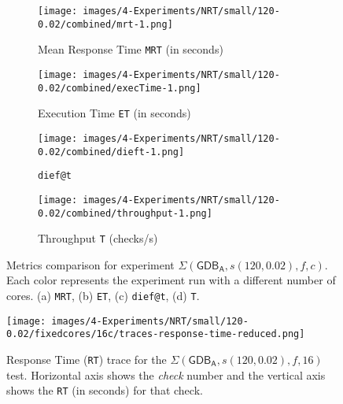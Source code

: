 \begin{figure}[H]
    \centering
    \hspace*{-3cm} %
    \begin{subfigure}{0.5\textwidth}
        \centering
        \texttt{[image: images/4-Experiments/NRT/small/120-0.02/combined/mrt-1.png]}
        \caption{Mean Response Time \texttt{MRT} (in seconds)}
        \label{fig:exps-small-120-mrt}
    \end{subfigure}
    \hspace{0.16\textwidth}
    \begin{subfigure}{0.5\textwidth}
        \centering
        \texttt{[image: images/4-Experiments/NRT/small/120-0.02/combined/execTime-1.png]}
        \caption{Execution Time \texttt{ET} (in seconds)}
        \label{fig:exps-small-120-et}
    \end{subfigure}
    
    \vspace{0.5cm} %

    \hspace*{-3cm} %
    \begin{subfigure}{0.5\textwidth}
        \centering
        \texttt{[image: images/4-Experiments/NRT/small/120-0.02/combined/dieft-1.png]}
        \caption{\texttt{dief@t}}
        \label{fig:exps-small-120-dieft}
    \end{subfigure}
    \hspace{0.16\textwidth}
    \begin{subfigure}{0.5\textwidth}
        \centering
        \texttt{[image: images/4-Experiments/NRT/small/120-0.02/combined/throughput-1.png]}
        \caption{Throughput \texttt{T} (checks/s)}
        \label{fig:exps-small-120-t}
    \end{subfigure}

    \caption{Metrics comparison for experiment $\Sigma(\mathsf{GDB_A}, s(120, 0.02), f, c)$. Each color represents the experiment run with a different number of cores.
    (a) \texttt{MRT}, (b) \texttt{ET}, (c) \texttt{dief@t}, (d) \texttt{T}.}
    \label{img:exps-small-120-combined}
\end{figure}

\begin{figure}[H]
    \centering
    \texttt{[image: images/4-Experiments/NRT/small/120-0.02/fixedcores/16c/traces-response-time-reduced.png]}
    \caption{Response Time (\texttt{RT}) trace for the $\Sigma(\mathsf{GDB_A}, s(120, 0.02), f, 16)$ test. Horizontal axis shows the \emph{check} number and the vertical axis shows the \texttt{RT} (in seconds) for that check.}
    \label{img:exps-small-120-traces-reduced}
\end{figure}

